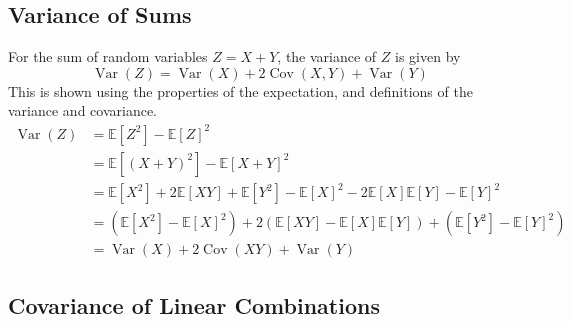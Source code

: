 \documentclass[11pt]{report} %
\begin{document}
\subsection{Variance of Sums}

For the sum of random variables $Z = X + Y$, the variance of $Z$ is given by
\begin{equation}
\operatorname{Var}\left(Z\right) = \operatorname{Var}\left(X\right) + 2\operatorname{Cov}\left(X, Y\right) + \operatorname{Var}\left(Y\right)
\end{equation}
This is shown using the properties of the expectation, and definitions of the variance and covariance.
\begin{align}
\operatorname{Var}\left(Z\right) &= \mathbb{E}\left[Z^{2}\right] - \mathbb{E}\left[Z\right]^{2} \\
&= \mathbb{E}\left[\left(X + Y\right)^{2}\right] - \mathbb{E}\left[X + Y\right]^{2} \\
&= \mathbb{E}\left[X^{2}\right] + 2\mathbb{E}\left[XY\right] + \mathbb{E}\left[Y^{2}\right] - \mathbb{E}\left[X\right]^{2} - 2\mathbb{E}\left[X\right]\mathbb{E}\left[Y\right] - \mathbb{E}\left[Y\right]^{2} \\
&= \left(\mathbb{E}\left[X^{2}\right] - \mathbb{E}\left[X\right]^{2}\right) + 2\left(\mathbb{E}\left[XY\right] - \mathbb{E}\left[X\right]\mathbb{E}\left[Y\right]\right) + \left(\mathbb{E}\left[Y^{2}\right] - \mathbb{E}\left[Y\right]^{2}\right) \\
&= \operatorname{Var}\left(X\right) + 2\operatorname{Cov}\left(XY\right) + \operatorname{Var}\left(Y\right)
\end{align}

\subsection{Covariance of Linear Combinations}
\end{document}
